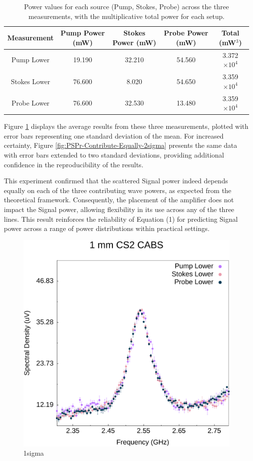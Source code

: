 \documentclass[%
  reprint,
  superscriptaddress,
  amsmath,amssymb,
  aps,
  prapplied,
]{revtex4-2}
\begin{document}
\begin{table}[h]
  \centering
  \renewcommand{\arraystretch}{1.2}
  \begin{tabular}{|c|c|c|c|c|}
    \hline
    \textbf{Measurement} & \textbf{Pump Power (mW)} & \textbf{Stokes Power (mW)} & \textbf{Probe Power (mW)} & \textbf{Total (mW$^{3}$)} \\
    \hline
    Pump Lower & 19.190 & 32.210 & 54.560 & 3.372 $\times 10^{4}$ \\
    Stokes Lower & 76.600 & 8.020 & 54.650 & 3.359 $\times 10^{4}$ \\
    Probe Lower & 76.600 & 32.530 & 13.480 & 3.359 $\times 10^{4}$ \\
    \hline
  \end{tabular}
    \caption{Power values for each source (Pump, Stokes, Probe) across the three measurements, with the multiplicative total power for each setup.}
    \label{tab:PSPr-Contribute-Equally}
\end{table}

Figure \ref{fig:PSPr-Contribute-Equally} displays the average results from these three measurements, plotted with error bars representing one standard deviation of the mean. For increased certainty, Figure \ref{fig:PSPr-Contribute-Equally-2sigma} presents the same data with error bars extended to two standard deviations, providing additional confidence in the reproducibility of the results.

This experiment confirmed that the scattered Signal power indeed depends equally on each of the three contributing wave powers, as expected from the theoretical framework. Consequently, the placement of the amplifier does not impact the Signal power, allowing flexibility in its use across any of the three lines. This result reinforces the reliability of Equation (1) for predicting Signal power across a range of power distributions within practical settings.



\begin{figure}[h]
  \centering
  \includegraphics[width=.45\textwidth]{PSPr-Contribute-Equally.pdf}
  \caption{1sigma}
  \label{fig:PSPr-Contribute-Equally}
\end{figure}
\end{document}
